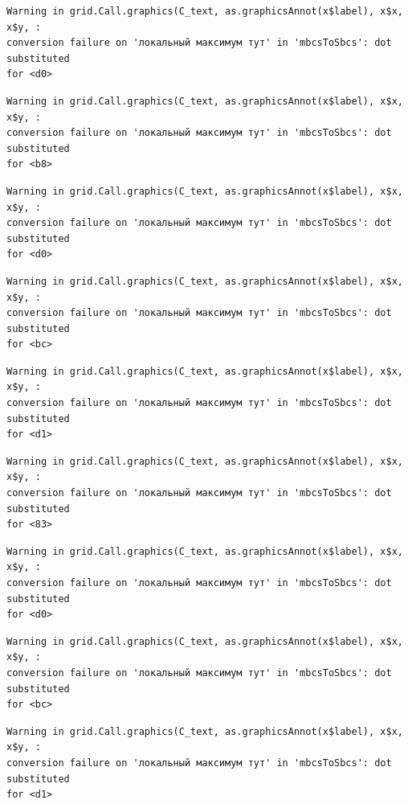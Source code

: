 \documentclass[
  letterpaper,
  DIV=11,
  numbers=noendperiod]{scrreprt}
\theoremstyle{definition}
\theoremstyle{remark}
\begin{document}
\begin{verbatim}
Warning in grid.Call.graphics(C_text, as.graphicsAnnot(x$label), x$x, x$y, :
conversion failure on 'локальный максимум тут' in 'mbcsToSbcs': dot substituted
for <d0>
\end{verbatim}

\begin{verbatim}
Warning in grid.Call.graphics(C_text, as.graphicsAnnot(x$label), x$x, x$y, :
conversion failure on 'локальный максимум тут' in 'mbcsToSbcs': dot substituted
for <b8>
\end{verbatim}

\begin{verbatim}
Warning in grid.Call.graphics(C_text, as.graphicsAnnot(x$label), x$x, x$y, :
conversion failure on 'локальный максимум тут' in 'mbcsToSbcs': dot substituted
for <d0>
\end{verbatim}

\begin{verbatim}
Warning in grid.Call.graphics(C_text, as.graphicsAnnot(x$label), x$x, x$y, :
conversion failure on 'локальный максимум тут' in 'mbcsToSbcs': dot substituted
for <bc>
\end{verbatim}

\begin{verbatim}
Warning in grid.Call.graphics(C_text, as.graphicsAnnot(x$label), x$x, x$y, :
conversion failure on 'локальный максимум тут' in 'mbcsToSbcs': dot substituted
for <d1>
\end{verbatim}

\begin{verbatim}
Warning in grid.Call.graphics(C_text, as.graphicsAnnot(x$label), x$x, x$y, :
conversion failure on 'локальный максимум тут' in 'mbcsToSbcs': dot substituted
for <83>
\end{verbatim}

\begin{verbatim}
Warning in grid.Call.graphics(C_text, as.graphicsAnnot(x$label), x$x, x$y, :
conversion failure on 'локальный максимум тут' in 'mbcsToSbcs': dot substituted
for <d0>
\end{verbatim}

\begin{verbatim}
Warning in grid.Call.graphics(C_text, as.graphicsAnnot(x$label), x$x, x$y, :
conversion failure on 'локальный максимум тут' in 'mbcsToSbcs': dot substituted
for <bc>
\end{verbatim}

\begin{verbatim}
Warning in grid.Call.graphics(C_text, as.graphicsAnnot(x$label), x$x, x$y, :
conversion failure on 'локальный максимум тут' in 'mbcsToSbcs': dot substituted
for <d1>
\end{verbatim}
\end{document}
